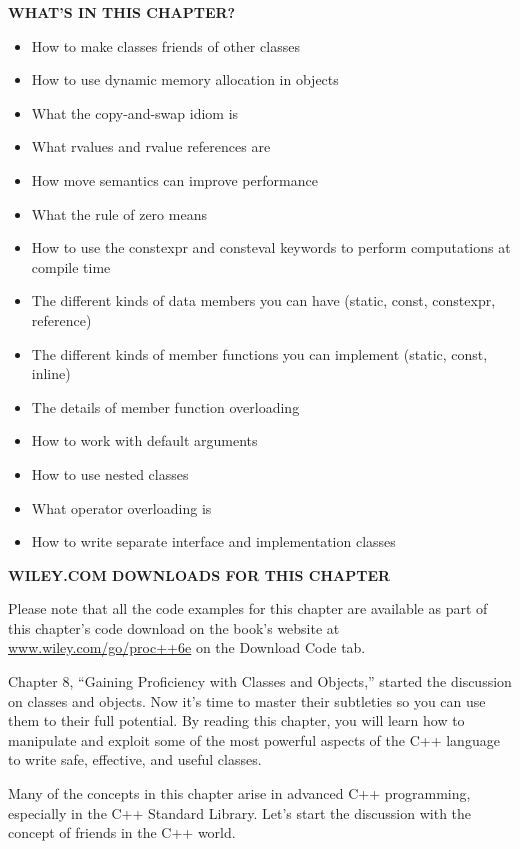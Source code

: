 \noindent
\textbf{WHAT’S IN THIS CHAPTER?}

\begin{itemize}
\item
How to make classes friends of other classes

\item
How to use dynamic memory allocation in objects

\item
What the copy-and-swap idiom is

\item
What rvalues and rvalue references are

\item
How move semantics can improve performance

\item
What the rule of zero means

\item
How to use the constexpr and consteval keywords to perform computations at compile time

\item
The different kinds of data members you can have (static, const, constexpr, reference)

\item
The different kinds of member functions you can implement (static, const, inline)

\item
The details of member function overloading

\item
How to work with default arguments

\item
How to use nested classes

\item
What operator overloading is

\item
How to write separate interface and implementation classes
\end{itemize}

\noindent
\textbf{WILEY.COM DOWNLOADS FOR THIS CHAPTER}

Please note that all the code examples for this chapter are available as part of this chapter’s code download on the book’s website at \url{www.wiley.com/go/proc++6e} on the Download Code tab.

Chapter 8, “Gaining Proficiency with Classes and Objects,” started the discussion on classes and objects. Now it’s time to master their subtleties so you can use them to their full potential. By reading this chapter, you will learn how to manipulate and exploit some of the most powerful aspects of the C++ language to write safe, effective, and useful classes.

Many of the concepts in this chapter arise in advanced C++ programming, especially in the C++ Standard Library. Let’s start the discussion with the concept of friends in the C++ world.














